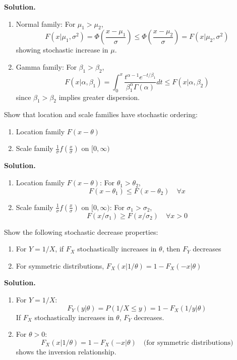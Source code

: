 \noindent\textbf{Solution.}
\begin{enumerate}[label=(\alph*)]
\item Normal family: For $\mu_1 > \mu_2$,
\[
F(x|\mu_1,\sigma^2) = \Phi\left(\frac{x-\mu_1}{\sigma}\right) \leq \Phi\left(\frac{x-\mu_2}{\sigma}\right) = F(x|\mu_2,\sigma^2)
\]
showing stochastic increase in $\mu$.

\item Gamma family: For $\beta_1 > \beta_2$,
\[
F(x|\alpha,\beta_1) = \int_0^x \frac{t^{\alpha-1}e^{-t/\beta_1}}{\beta_1^\alpha\Gamma(\alpha)}dt \leq F(x|\alpha,\beta_2)
\]
since $\beta_1 > \beta_2$ implies greater dispersion.
\end{enumerate}

\begin{problembox}
Show that location and scale families have stochastic ordering:
\begin{enumerate}[label=(\alph*)]
\item Location family $F(x-\theta)$
\item Scale family $\frac{1}{\sigma}f\left(\frac{x}{\sigma}\right)$ on $[0,\infty)$
\end{enumerate}
\end{problembox}

\noindent\textbf{Solution.}
\begin{enumerate}[label=(\alph*)]
\item Location family $F(x-\theta)$: For $\theta_1 > \theta_2$,
\[
F(x-\theta_1) \leq F(x-\theta_2) \quad \forall x
\]

\item Scale family $\frac{1}{\sigma}f\left(\frac{x}{\sigma}\right)$ on $[0,\infty)$: For $\sigma_1 > \sigma_2$,
\[
F(x/\sigma_1) \geq F(x/\sigma_2) \quad \forall x > 0
\]
\end{enumerate}

\begin{problembox}
Show the following stochastic decrease properties:
\begin{enumerate}[label=(\alph*)]
\item For $Y = 1/X$, if $F_X$ stochastically increases in $\theta$, then $F_Y$ decreases
\item For symmetric distributions, $F_X(x|1/\theta) = 1 - F_X(-x|\theta)$
\end{enumerate}
\end{problembox}

\noindent\textbf{Solution.}
\begin{enumerate}[label=(\alph*)]
\item For $Y = 1/X$:
\[
F_Y(y|\theta) = P(1/X \leq y) = 1 - F_X(1/y|\theta)
\]
If $F_X$ stochastically increases in $\theta$, $F_Y$ decreases.

\item For $\theta > 0$:
\[
F_X(x|1/\theta) = 1 - F_X(-x|\theta) \quad \text{(for symmetric distributions)}
\]
shows the inversion relationship.
\end{enumerate}


